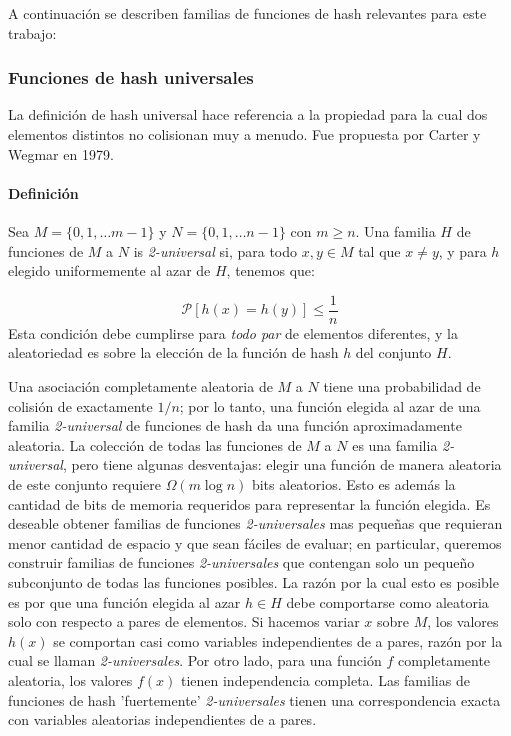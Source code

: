 \documentclass[a4paper,10pt, oneside]{article}
\begin{document}
A continuación se describen familias de funciones de hash relevantes para este trabajo:
\subsubsection{Funciones de hash universales}
La definición de hash universal hace referencia a la propiedad para la cual dos elementos distintos no colisionan muy a menudo. Fue propuesta por Carter y Wegmar en 1979\cite{WEGMAN1981265}.


\paragraph{Definición} Sea $M = \{0, 1, \dots m-1 \}$ y $N = \{0, 1, \dots n-1 \}$ con $m \geq n$. Una familia $H$ de funciones de $M$ a $N$ is \textit{2-universal} si, para todo $x,y \in M$ tal que $x\neq y$, y para $h$ elegido uniformemente al azar de $H$, tenemos que: 

\begin{equation}
	\mathcal{P}[h(x) = h(y)] \leq \frac{1}{n}
\end{equation}
Esta condición debe cumplirse para \textit{todo par} de elementos diferentes, y la aleatoriedad es sobre la elección de la función de hash $h$ del conjunto $H$.

Una asociación completamente aleatoria de $M$ a $N$ tiene una probabilidad de colisión de exactamente $1/n$; por lo tanto, una función elegida al azar de una familia \textit{2-universal} de funciones de hash da una función aproximadamente aleatoria. La colección de todas las funciones de $M$ a $N$ es una familia \textit{2-universal}, pero tiene algunas desventajas: elegir una función de manera aleatoria de este conjunto requiere $\Omega(m \log n)$ bits aleatorios. Esto es además la cantidad de bits de memoria requeridos para representar la función elegida. Es deseable obtener familias de funciones \textit{2-universales} mas pequeñas que requieran menor cantidad de espacio y que sean fáciles de evaluar; en particular, queremos construir familias de funciones \textit{2-universales} que contengan solo un pequeño subconjunto de todas las funciones posibles. La razón por la cual esto es posible es por que una función elegida al azar $h \in H$ debe comportarse como aleatoria solo con respecto a pares de elementos. Si hacemos variar $x$ sobre $M$, los valores $h(x)$ se comportan casi como variables independientes de a pares, razón por la cual se llaman \textit{2-universales}. Por otro lado, para una función $f$ completamente aleatoria, los valores $f(x)$ tienen independencia completa. Las familias de funciones de hash 'fuertemente' \textit{2-universales} tienen una correspondencia exacta con variables aleatorias independientes de a pares.
\end{document}
